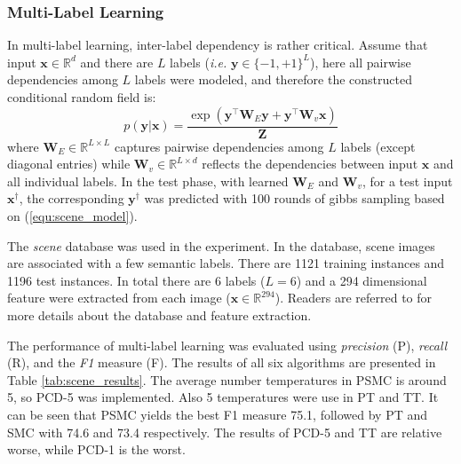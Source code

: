 \subsubsection{Multi-Label Learning}
In multi-label learning, inter-label dependency is rather critical. Assume that input $\mathbf{x}\in \mathbb{R}^d$ and there are $L$ labels (\emph{i.e.} $\mathbf{y}\in\{-1,+1\}^L$), here all pairwise 
dependencies among $L$ labels were modeled, and therefore 
the constructed conditional random field is:
\begin{equation}
	p(\mathbf{y}|\mathbf{x})=\frac{\exp(\mathbf{y}^\top\mathbf{W}_E \mathbf{y}+\mathbf{y}^\top \mathbf{W}_v \mathbf{x})}{\mathbf{Z}}
	\label{equ:scene_model}
\end{equation}
where $\mathbf{W}_E\in \mathbb{R}^{L\times L}$ captures pairwise dependencies among $L$ labels (except diagonal entries) while $\mathbf{W}_v\in \mathbb{R}^{L\times d}$ reflects the 
dependencies between input $\mathbf{x}$ and all individual labels.   
In the test phase, with learned $\mathbf{W}_E$ and $\mathbf{W}_v$, for a test input $\mathbf{x}^\dagger$, the corresponding $\mathbf{y}^\dagger$ was predicted with 
100 rounds of gibbs sampling based on (\ref{equ:scene_model}).  

The \emph{scene} database \citep{scene_database} was used in the experiment.  In the database, scene images are associated with a few semantic labels.
There are 1121 training instances and 1196 test instances.  In total there are 6 labels ($L=6$) and a 294 dimensional feature were extracted from each image         
($\mathbf{x}\in\mathbb{R}^{294}$). Readers are referred to \cite{scene_database} for more details about the database and feature extraction.  

The performance of multi-label learning was evaluated using \emph{precision} (P), \emph{recall} (R), and the \emph{F1} measure (F). 
The results of all six algorithms are presented in Table \ref{tab:scene_results}.     
The average number temperatures in PSMC is around 5, so PCD-5 was implemented. Also 5 temperatures were use in PT and TT.    
It can be seen that PSMC yields the best F1 measure 75.1, followed by PT and SMC with 74.6 and 73.4 respectively. The results of PCD-5 and TT             
are relative worse, while PCD-1 is the worst.  


